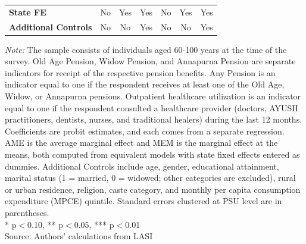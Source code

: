 \begin{table}[H]
{\begin{tabular}{lcccccc}
\midrule
\textbf{State FE} & No & Yes & Yes & No & Yes & Yes \\
\textbf{Additional Controls} & No & No & Yes & No & No & Yes \\
\bottomrule
\midrule
\end{tabular}
}
\vspace{2mm}
\begin{minipage}{0.95\textwidth}
\footnotesize \textit{Note:} The sample consists of individuals aged 60-100 years at the time of the survey. Old Age Pension, Widow Pension, and Annapurna Pension are separate indicators for receipt of the respective pension benefits. Any Pension is an indicator equal to one if the respondent receives at least one of the Old Age, Widow, or Annapurna pensions. Outpatient healthcare utilization is an indicator equal to one if the respondent consulted a healthcare provider (doctors, AYUSH practitioners, dentists, nurses, and traditional healers) during the last 12 months. Coefficients are probit estimates, and each comes from a separate regression. AME is the average marginal effect and MEM is the marginal effect at the means, both computed from equivalent models with state fixed effects entered as dummies. Additional Controls include age, gender, educational attainment, marital status (1 = married, 0 = widowed; other categories are excluded), rural or urban residence, religion, caste category, and monthly per capita consumption expenditure (MPCE) quintile. Standard errors clustered at PSU level are in parentheses. \\ * p$<$0.10, ** p$<$0.05, *** p$<$0.01\\
Source: Authors' calculations from LASI
\end{minipage}
\end{table}
